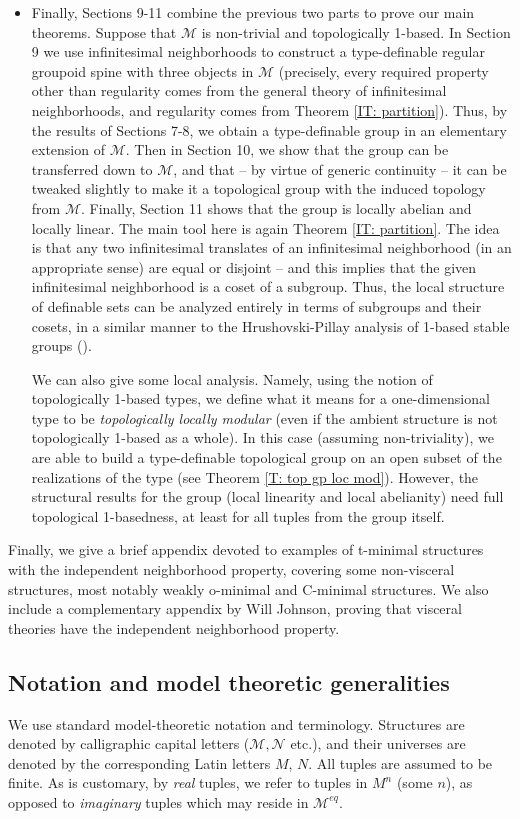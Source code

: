 \documentclass{amsart}
\theoremstyle{definition}
\begin{document}
\begin{itemize}
\item Finally, Sections 9-11 combine the previous two parts to prove our main theorems. Suppose that $\mathcal M$ is non-trivial and topologically 1-based. In Section 9 we use infinitesimal neighborhoods to construct a type-definable regular groupoid spine with three objects in $\mathcal M$ (precisely, every required property other than regularity comes from the general theory of infinitesimal neighborhoods, and regularity comes from Theorem \ref{IT: partition}). Thus, by the results of Sections 7-8, we obtain a type-definable group in an elementary extension of $\mathcal M$. Then in Section 10, we show that the group can be transferred down to $\mathcal M$, and that -- by virtue of generic continuity -- it can be tweaked slightly to make it a topological group with the induced topology from $\mathcal M$. Finally, Section 11 shows that the group is locally abelian and locally linear. The main tool here is again Theorem \ref{IT: partition}. The idea is that any two infinitesimal translates of an infinitesimal neighborhood (in an appropriate sense) are equal or disjoint -- and this implies that the given infinitesimal neighborhood is a coset of a subgroup. Thus, the local structure of definable sets can be analyzed entirely in terms of subgroups and their cosets, in a similar manner to the Hrushovski-Pillay analysis of 1-based stable groups (\cite{HrPi87}).

We can also give some local analysis. Namely, using the notion of topologically 1-based types, we define what it means for a one-dimensional type to be \textit{topologically locally modular} (even if the ambient structure is not topologically 1-based as a whole). In this case (assuming non-triviality), we are able to build a type-definable topological group on an open subset of the realizations of the type (see Theorem \ref{T: top gp loc mod}). However, the structural results for the group (local linearity and local abelianity) need full topological 1-basedness, at least for all tuples from the group itself.
\end{itemize}


Finally, we give a brief appendix devoted to examples of t-minimal structures with the independent neighborhood property,  covering some non-visceral structures, most notably weakly o-minimal and C-minimal structures. We also include a complementary appendix by Will Johnson, proving that visceral theories have the independent neighborhood property.  

\subsection{Notation and model theoretic generalities}
We use standard model-theoretic notation and terminology. Structures are denoted by calligraphic capital letters ($\mathcal M, \mathcal N$ etc.), and their universes are denoted by the corresponding Latin letters $M$, $N$. All tuples are assumed to be finite. As is customary, by \emph{real} tuples, we refer to tuples in $M^n$ (some $n$), as opposed to \textit{imaginary} tuples which may reside in $\mathcal M^{eq}$.  
\end{document}
